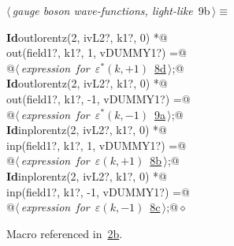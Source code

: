 \documentclass[a4paper,12pt]{amsart}
\renewcommand{\NWtarget}[2]{\hypertarget{#1}{#2}}
\renewcommand{\NWlink}[2]{\hyperlink{#1}{#2}}
\renewcommand{\NWtxtMacroRefIn}{Macro referenced in}
\renewcommand{\NWsep}{${\diamond}$}
\begin{document}
\begin{flushleft} \small
\begin{minipage}{\linewidth}\label{scrap23}\raggedright\small
\NWtarget{nuweb9b}{} $\langle\,${\itshape gauge boson wave-functions, light-like}\nobreak\ {\footnotesize {9b}}$\,\rangle\equiv$
\vspace{-1ex}
\begin{list}{}{} \item
\mbox{}\verb@@\hbox{\sffamily\bfseries Id}\verb@ outlorentz(2, ivL2?, k1?, 0) *@\\
\mbox{}\verb@      out(field1?, k1?,  1, vDUMMY1?) =@\\
\mbox{}\verb@   @\hbox{$\langle\,${\itshape expression for $\varepsilon^\ast(k, +1)$}\nobreak\ {\footnotesize \NWlink{nuweb8d}{8d}}$\,\rangle$}\verb@;@\\
\mbox{}\verb@@\hbox{\sffamily\bfseries Id}\verb@ outlorentz(2, ivL2?, k1?, 0) *@\\
\mbox{}\verb@      out(field1?, k1?, -1, vDUMMY1?) =@\\
\mbox{}\verb@   @\hbox{$\langle\,${\itshape expression for $\varepsilon^\ast(k, -1)$}\nobreak\ {\footnotesize \NWlink{nuweb9a}{9a}}$\,\rangle$}\verb@;@\\
\mbox{}\verb@@\hbox{\sffamily\bfseries Id}\verb@ inplorentz(2, ivL2?, k1?, 0) *@\\
\mbox{}\verb@      inp(field1?, k1?,  1, vDUMMY1?) =@\\
\mbox{}\verb@   @\hbox{$\langle\,${\itshape expression for $\varepsilon(k, +1)$}\nobreak\ {\footnotesize \NWlink{nuweb8b}{8b}}$\,\rangle$}\verb@;@\\
\mbox{}\verb@@\hbox{\sffamily\bfseries Id}\verb@ inplorentz(2, ivL2?, k1?, 0) *@\\
\mbox{}\verb@      inp(field1?, k1?, -1, vDUMMY1?) =@\\
\mbox{}\verb@   @\hbox{$\langle\,${\itshape expression for $\varepsilon(k, -1)$}\nobreak\ {\footnotesize \NWlink{nuweb8c}{8c}}$\,\rangle$}\verb@;@{\NWsep}
\end{list}
\vspace{-1.5ex}
\footnotesize
\begin{list}{}{\setlength{\itemsep}{-\parsep}\setlength{\itemindent}{-\leftmargin}}
\item \NWtxtMacroRefIn\ \NWlink{nuweb2b}{2b}.

\item{}
\end{list}
\end{minipage}\vspace{4ex}
\end{flushleft}
\end{document}
